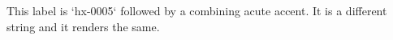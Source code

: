 \begin{lemma}\label{hx-0005ÃÅ}
This label is `hx-0005` followed by a combining acute accent. It is a different string and it renders the same.
\end{lemma}
